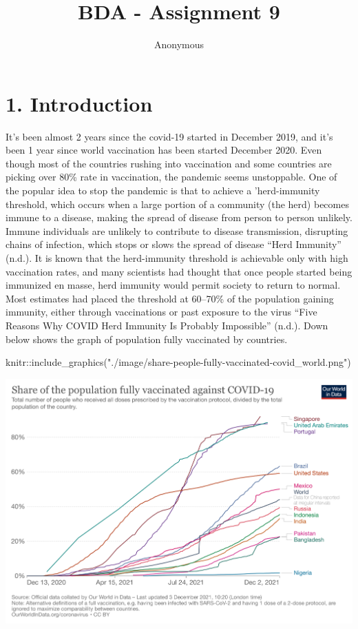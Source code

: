 \documentclass[
]{article}
\title{BDA - Assignment 9}
\author{Anonymous}
\date{}
\newenvironment{Shaded}{\begin{snugshade}}{\end{snugshade}}
\newcommand{\FunctionTok}[1]{\textcolor[rgb]{0.00,0.00,0.00}{#1}}
\newcommand{\NormalTok}[1]{#1}
\newcommand{\SpecialCharTok}[1]{\textcolor[rgb]{0.00,0.00,0.00}{#1}}
\newcommand{\StringTok}[1]{\textcolor[rgb]{0.31,0.60,0.02}{#1}}
\begin{document}
\maketitle

{
\hypersetup{linkcolor=}
\setcounter{tocdepth}{1}
\tableofcontents
}
\hypertarget{introduction}{%
\section{1. Introduction}\label{introduction}}

It's been almost 2 years since the covid-19 started in December 2019,
and it's been 1 year since world vaccination has been started December
2020. Even though most of the countries rushing into vaccination and
some countries are picking over 80\% rate in vaccination, the pandemic
seems unstoppable. One of the popular idea to stop the pandemic is that
to achieve a 'herd-immunity threshold, which occurs when a large portion
of a community (the herd) becomes immune to a disease, making the spread
of disease from person to person unlikely. Immune individuals are
unlikely to contribute to disease transmission, disrupting chains of
infection, which stops or slows the spread of disease {``Herd
Immunity''} (n.d.). It is known that the herd-immunity threshold is
achievable only with high vaccination rates, and many scientists had
thought that once people started being immunized en masse, herd immunity
would permit society to return to normal. Most estimates had placed the
threshold at 60--70\% of the population gaining immunity, either through
vaccinations or past exposure to the virus {``Five Reasons Why COVID
Herd Immunity Is Probably Impossible''} (n.d.). Down below shows the
graph of population fully vaccinated by countries.

\begin{Shaded}
\begin{Highlighting}[]
\NormalTok{knitr}\SpecialCharTok{::}\FunctionTok{include\_graphics}\NormalTok{(}\StringTok{"./image/share{-}people{-}fully{-}vaccinated{-}covid\_world.png"}\NormalTok{)}
\end{Highlighting}
\end{Shaded}

\includegraphics{./image/share-people-fully-vaccinated-covid_world.png}
\end{document}

